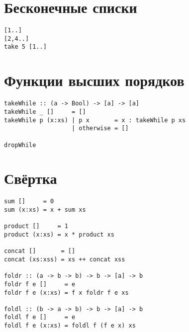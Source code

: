 \documentclass[a4paper,10pt]{article}
\begin{document}
\section{Бесконечные списки}
\begin{lstlisting}
[1..]
[2,4..]
take 5 [1..]               
\end{lstlisting}

\section{Функции высших порядков}

\begin{lstlisting}
takeWhile :: (a -> Bool) -> [a] -> [a]
takeWhile _ []     = []
takeWhile p (x:xs) | p x       = x : takeWhile p xs
                   | otherwise = []

dropWhile                  
\end{lstlisting}

\section{Свёртка}

\begin{lstlisting}
sum []     = 0
sum (x:xs) = x + sum xs

product []     = 1
product (x:xs) = x * product xs

concat []       = []
concat (xs:xss) = xs ++ concat xss

foldr :: (a -> b -> b) -> b -> [a] -> b
foldr f e []     = e
foldr f e (x:xs) = f x foldr f e xs

foldl :: (b -> a -> b) -> b -> [a] -> b
foldl f e []     = e
foldl f e (x:xs) = foldl f (f e x) xs
\end{lstlisting}
\end{document}
